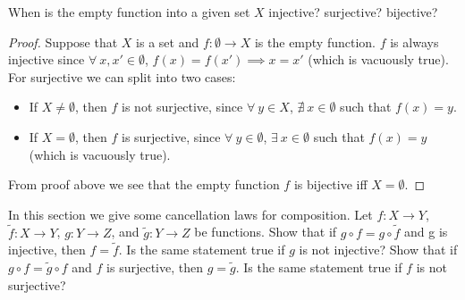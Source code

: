 \begin{exercise}\label{ex 3.3.3}
    When is the empty function into a given set \(X\) injective?
    surjective?
    bijective?
\end{exercise}

\begin{proof}
    Suppose that \(X\) is a set and \(f : \emptyset \to X\) is the empty function.
    \(f\) is always injective since \(\forall\ x, x' \in \emptyset\), \(f(x) = f(x') \implies x = x'\) (which is vacuously true).
    For surjective we can split into two cases:
    \begin{itemize}
        \item If \(X \neq \emptyset\), then \(f\) is not surjective, since \(\forall\ y \in X\), \(\nexists\ x \in \emptyset\) such that \(f(x) = y\).
        \item If \(X = \emptyset\), then \(f\) is surjective, since \(\forall\ y \in \emptyset\), \(\exists\ x \in \emptyset\) such that \(f(x) = y\) (which is vacuously true).
    \end{itemize}
    From proof above we see that the empty function \(f\) is bijective iff \(X = \emptyset\).
\end{proof}

\begin{exercise}\label{ex 3.3.4}
    In this section we give some cancellation laws for composition.
    Let \(f : X \to Y\), \(\tilde{f} : X \to Y\), \(g : Y \to Z\), and \(\tilde{g} : Y \to Z\) be functions.
    Show that if \(g \circ f = g \circ \tilde{f}\) and g is injective, then \(f = \tilde{f}\).
    Is the same statement true if \(g\) is not injective?
    Show that if \(g \circ f = \tilde{g} \circ f\) and \(f\) is surjective, then \(g = \tilde{g}\).
    Is the same statement true if \(f\) is not surjective?
\end{exercise}

